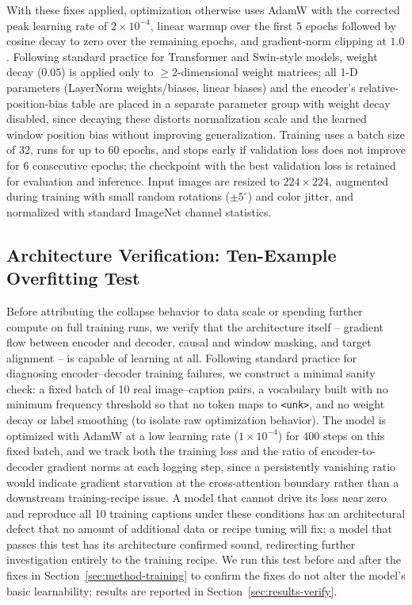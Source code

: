 \documentclass[conference]{IEEEtran}
\begin{document}
With these fixes applied, optimization otherwise uses AdamW with the corrected peak learning rate of $2\times10^{-4}$, linear warmup over the first 5 epochs followed by cosine decay to zero over the remaining epochs, and gradient-norm clipping at $1.0$. Following standard practice for Transformer and Swin-style models, weight decay ($0.05$) is applied only to $\ge 2$-dimensional weight matrices; all 1-D parameters (LayerNorm weights/biases, linear biases) and the encoder's relative-position-bias table are placed in a separate parameter group with weight decay disabled, since decaying these distorts normalization scale and the learned window position bias without improving generalization. Training uses a batch size of 32, runs for up to 60 epochs, and stops early if validation loss does not improve for 6 consecutive epochs; the checkpoint with the best validation loss is retained for evaluation and inference. Input images are resized to $224\times224$, augmented during training with small random rotations ($\pm5^{\circ}$) and color jitter, and normalized with standard ImageNet channel statistics.

\subsection{Architecture Verification: Ten-Example Overfitting Test}
\label{sec:method-verify}

Before attributing the collapse behavior to data scale or spending further compute on full training runs, we verify that the architecture itself -- gradient flow between encoder and decoder, causal and window masking, and target alignment -- is capable of learning at all. Following standard practice for diagnosing encoder--decoder training failures, we construct a minimal sanity check: a fixed batch of 10 real image--caption pairs, a vocabulary built with no minimum frequency threshold so that no token maps to \texttt{<unk>}, and no weight decay or label smoothing (to isolate raw optimization behavior). The model is optimized with AdamW at a low learning rate ($1\times10^{-4}$) for 400 steps on this fixed batch, and we track both the training loss and the ratio of encoder-to-decoder gradient norms at each logging step, since a persistently vanishing ratio would indicate gradient starvation at the cross-attention boundary rather than a downstream training-recipe issue. A model that cannot drive its loss near zero and reproduce all 10 training captions under these conditions has an architectural defect that no amount of additional data or recipe tuning will fix; a model that passes this test has its architecture confirmed sound, redirecting further investigation entirely to the training recipe. We run this test before and after the fixes in Section~\ref{sec:method-training} to confirm the fixes do not alter the model's basic learnability; results are reported in Section~\ref{sec:results-verify}.
\end{document}
